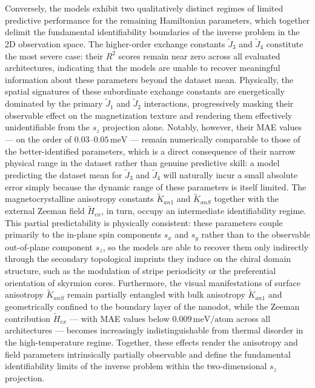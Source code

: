 \documentclass[final,5p,times,twocolumn]{elsarticle}
\begin{document}
Conversely, the models exhibit two qualitatively distinct regimes of
limited predictive performance for the remaining Hamiltonian
parameters, which together delimit the fundamental identifiability
boundaries of the inverse problem in the 2D observation space. The
higher-order exchange constants $\tilde{J}_3$ and $\tilde{J}_4$
constitute the most severe case: their $R^2$ scores remain near zero
across all evaluated architectures, indicating that the models are
unable to recover meaningful information about these parameters
beyond the dataset mean. Physically, the spatial signatures of these
subordinate exchange constants are energetically dominated by the
primary $\tilde{J}_1$ and $\tilde{J}_2$ interactions, progressively
masking their observable effect on the magnetization texture and
rendering them effectively unidentifiable from the $s_z$ projection
alone. Notably, however, their MAE values --- on the order of
$0.03$--$0.05\,\mathrm{meV}$ --- remain numerically comparable to
those of the better-identified parameters, which is a direct
consequence of their narrow physical range in the dataset rather than
genuine predictive skill: a model predicting the dataset mean for
$\tilde{J}_3$ and $\tilde{J}_4$ will naturally incur a small absolute
error simply because the dynamic range of these parameters is itself
limited. The magnetocrystalline anisotropy constants $\tilde{K}_{an1}$
and $\tilde{K}_{anS}$ together with the external Zeeman field
$\tilde{H}_{ex}$, in turn, occupy an intermediate identifiability
regime. This partial predictability is physically consistent: these
parameters couple primarily to the in-plane spin components $s_x$
and $s_y$ rather than to the observable out-of-plane component
$s_z$, so the models are able to recover them only indirectly through
the secondary topological imprints they induce on the chiral domain
structure, such as the modulation of stripe periodicity or the
preferential orientation of skyrmion cores. Furthermore, the visual
manifestations of surface anisotropy $\tilde{K}_{anS}$ remain
partially entangled with bulk anisotropy $\tilde{K}_{an1}$ and
geometrically confined to the boundary layer of the nanodot, while
the Zeeman contribution $\tilde{H}_{ex}$ --- with MAE values below
$0.009\,\mathrm{meV/atom}$ across all architectures --- becomes
increasingly indistinguishable from thermal disorder in the
high-temperature regime. Together, these effects render the anisotropy
and field parameters intrinsically partially observable and define the
fundamental identifiability limits of the inverse problem within the
two-dimensional $s_z$ projection.
\end{document}
